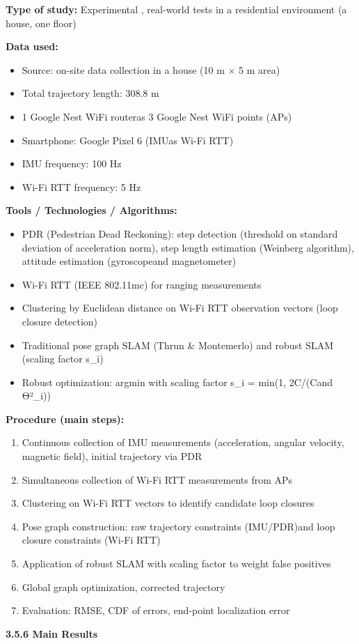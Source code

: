 \documentclass{ipgpmaster}
\begin{document}
\textbf{Type of study:} Experimental ,  real-world tests in a residential environment (a house, one floor)

\textbf{Data used:}

\begin{itemize}
    \item Source: on-site data collection in a house (10 m × 5 m area)
    \item Total trajectory length: 308.8 m
    \item 1 Google Nest WiFi routeras  3 Google Nest WiFi points (APs)
    \item Smartphone: Google Pixel 6 (IMUas  Wi-Fi RTT)
    \item IMU frequency: 100 Hz
    \item Wi-Fi RTT frequency: 5 Hz
\end{itemize}
\textbf{Tools / Technologies / Algorithms:}

\begin{itemize}
    \item PDR (Pedestrian Dead Reckoning): step detection (threshold on standard deviation of acceleration norm), step length estimation (Weinberg algorithm), attitude estimation (gyroscopeand  magnetometer)
    \item Wi-Fi RTT (IEEE 802.11mc) for ranging measurements
    \item Clustering by Euclidean distance on Wi-Fi RTT observation vectors (loop closure detection)
    \item Traditional pose graph SLAM (Thrun \& Montemerlo) and robust SLAM (scaling factor s\_i)
    \item Robust optimization: argmin with scaling factor s\_i = min(1, 2C/(Cand  Θ²\_i))
\end{itemize}
\textbf{Procedure (main steps):}

\begin{enumerate}
    \item Continuous collection of IMU measurements (acceleration, angular velocity, magnetic field),  initial trajectory via PDR
    \item Simultaneous collection of Wi-Fi RTT measurements from APs
    \item Clustering on Wi-Fi RTT vectors to identify candidate loop closures
    \item Pose graph construction: raw trajectory constraints (IMU/PDR)and  loop closure constraints (Wi-Fi RTT)
    \item Application of robust SLAM with scaling factor to weight false positives
    \item Global graph optimization,  corrected trajectory
    \item Evaluation: RMSE, CDF of errors, end-point localization error

\end{enumerate}
 \textbf{3.5.6   Main Results}
\end{document}
